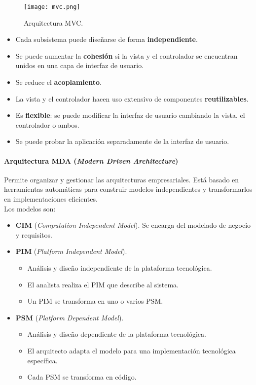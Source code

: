 \documentclass[12pt,spanish]{article}
\begin{document}
\begin{figure}[H]
\centering
\texttt{[image: mvc.png]}
\caption{Arquitectura MVC.}
\end{figure}

\begin{itemize}
	\item Cada subsistema puede diseñarse de forma \textbf{independiente}.
	\item Se puede aumentar la \textbf{cohesión} si la vista y el controlador se encuentran unidos en una capa de interfaz de usuario.
	\item Se reduce el \textbf{acoplamiento}.
	\item La vista y el controlador hacen uso extensivo de componentes \textbf{reutilizables}.
	\item Es \textbf{flexible}: se puede modificar la interfaz de usuario cambiando la vista, el controlador o ambos.
	\item Se puede probar la aplicación separadamente de la interfaz de usuario.
\end{itemize}

\newpage

\paragraph{Arquitectura MDA (\textit{Modern Driven Architecture})\\}

Permite organizar y gestionar las arquitecturas empresariales. Está basado en herramientas automáticas para construir modelos independientes y transformarlos en implementaciones eficientes.\\

Los modelos son:

\begin{itemize}
	\item \textbf{CIM} (\textit{Computation Independent Model}). Se encarga del modelado de negocio y requisitos.
	\item \textbf{PIM} (\textit{Platform Independent Model}).
		\begin{itemize}
			\item Análisis y diseño independiente de la plataforma tecnológica.
			\item El analista realiza el PIM que describe al sistema.
			\item Un PIM se transforma en uno o varios PSM.
		\end{itemize}
		\item \textbf{PSM} (\textit{Platform Dependent Model}).
			\begin{itemize}
			\item Análisis y diseño dependiente de la plataforma tecnológica.
			\item El arquitecto adapta el modelo para una implementación tecnológica específica.
			\item Cada PSM se transforma en código.
		\end{itemize}
\end{itemize}
\end{document}
